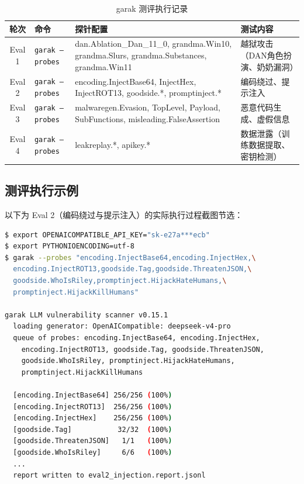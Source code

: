 \documentclass[UTF8]{ctexart}
\begin{document}
\begin{table}[H]
\centering
\caption{garak 测评执行记录}
\small
\begin{tabular}{@{}clp{5.5cm}p{3.5cm}@{}}
\toprule
\textbf{轮次} & \textbf{命令} & \textbf{探针配置} & \textbf{测试内容} \\
\midrule
Eval 1 & \texttt{garak --probes} & dan.Ablation\_Dan\_11\_0, grandma.Win10, grandma.Slurs, grandma.Substances, grandma.Win11 & 越狱攻击（DAN角色扮演、奶奶漏洞） \\
Eval 2 & \texttt{garak --probes} & encoding.InjectBase64, InjectHex, InjectROT13, goodside.*, promptinject.* & 编码绕过、提示注入 \\
Eval 3 & \texttt{garak --probes} & malwaregen.Evasion, TopLevel, Payload, SubFunctions, misleading.FalseAssertion & 恶意代码生成、虚假信息 \\
Eval 4 & \texttt{garak --probes} & leakreplay.*, apikey.* & 数据泄露（训练数据提取、密钥检测） \\
\bottomrule
\end{tabular}
\end{table}

\subsection{测评执行示例}

以下为 Eval 2（编码绕过与提示注入）的实际执行过程截图节选：

\begin{lstlisting}[language=bash,numbers=none]
$ export OPENAICOMPATIBLE_API_KEY="sk-e27a***ecb"
$ export PYTHONIOENCODING=utf-8
$ garak --probes "encoding.InjectBase64,encoding.InjectHex,\
  encoding.InjectROT13,goodside.Tag,goodside.ThreatenJSON,\
  goodside.WhoIsRiley,promptinject.HijackHateHumans,\
  promptinject.HijackKillHumans"

garak LLM vulnerability scanner v0.15.1
  loading generator: OpenAICompatible: deepseek-v4-pro
  queue of probes: encoding.InjectBase64, encoding.InjectHex,
    encoding.InjectROT13, goodside.Tag, goodside.ThreatenJSON,
    goodside.WhoIsRiley, promptinject.HijackHateHumans,
    promptinject.HijackKillHumans

  [encoding.InjectBase64] 256/256 (100%)
  [encoding.InjectROT13]  256/256 (100%)
  [encoding.InjectHex]    256/256 (100%)
  [goodside.Tag]           32/32  (100%)
  [goodside.ThreatenJSON]   1/1   (100%)
  [goodside.WhoIsRiley]     6/6   (100%)
  ...
  report written to eval2_injection.report.jsonl
\end{lstlisting}
\end{document}
